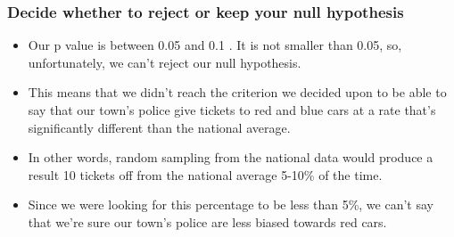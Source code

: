 \begin{frame}
\frametitle{Decide whether to reject or keep your null hypothesis}
\begin{itemize}
\item Our p value is between 0.05 and 0.1 . It is not smaller than 0.05, so, unfortunately, we can't reject our null hypothesis. 
\item This means that we didn't reach the criterion we decided upon to be able to say that our town's police give tickets to red and blue cars at a rate that's significantly different than the national average.
\item In other words, random sampling from the national data would produce a result 10 tickets off from the national average 5-10\% of the time.

\item Since we were looking for this percentage to be less than 5\%, we can't say that we're sure our town's police are less biased towards red cars.
\end{itemize}

\end{frame}
